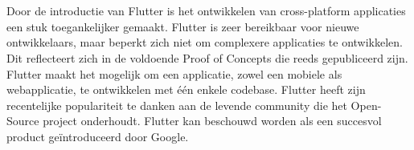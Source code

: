 
\chapter{}
\label{ch:inleiding}

Door de introductie van Flutter is het ontwikkelen van cross-platform applicaties een stuk toegankelijker gemaakt. Flutter is zeer bereikbaar voor nieuwe ontwikkelaars, maar beperkt zich niet om complexere applicaties te ontwikkelen. Dit reflecteert zich in de voldoende Proof of Concepts die reeds gepubliceerd zijn. Flutter maakt het mogelijk om een applicatie, zowel een mobiele als webapplicatie, te ontwikkelen met één enkele codebase. Flutter heeft zijn recentelijke populariteit te danken aan de levende community die het Open-Source project onderhoudt. Flutter kan beschouwd worden als een succesvol product geïntroduceerd door Google.
\newline



\section{}
\label{sec:probleemstelling}


